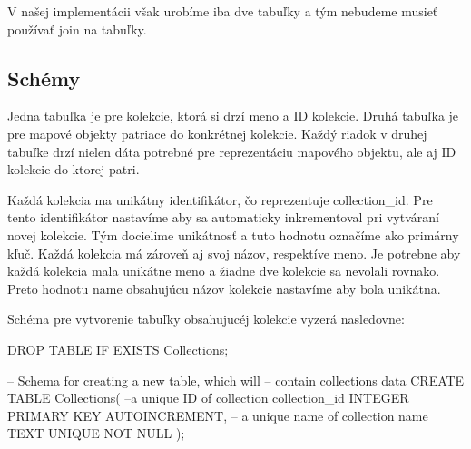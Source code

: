 V našej implementácii však urobíme iba dve tabuľky a tým nebudeme musieť používať join na tabuľky. 

\subsection*{Schémy}
Jedna tabuľka je pre kolekcie, ktorá si drzí meno a ID kolekcie. Druhá tabuľka je pre mapové objekty patriace do konkrétnej kolekcie. Každý riadok v druhej tabuľke 
drzí nielen dáta potrebné pre reprezentáciu mapového objektu, ale aj ID kolekcie do ktorej patri. 

Každá kolekcia ma unikátny identifikátor, čo reprezentuje collection\_id. Pre tento identifikátor nastavíme aby sa automaticky inkrementoval pri vytváraní novej kolekcie. Tým docielime 
unikátnosť a tuto hodnotu označíme ako primárny kľuč. Každá kolekcia má zároveň aj svoj názov, respektíve meno. Je potrebne aby každá kolekcia mala unikátne meno a žiadne dve kolekcie sa nevolali rovnako. 
Preto hodnotu name obsahujúcu názov kolekcie nastavíme aby bola unikátna. 

Schéma pre vytvorenie tabuľky obsahujucéj kolekcie vyzerá nasledovne: 
\begin{code}
      DROP TABLE IF EXISTS Collections;

      -- Schema for creating a new table, which will 
      -- contain collections data
      CREATE TABLE Collections(
      --a unique ID of collection
      collection_id INTEGER PRIMARY KEY AUTOINCREMENT,
      -- a unique name of collection
      name TEXT UNIQUE NOT NULL 
      );
\end{code}

